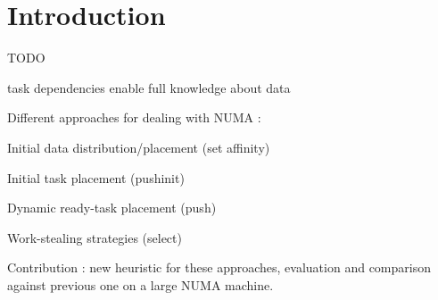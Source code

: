 \documentclass{Styles/llncs}
\begin{document}
\section{Introduction}

TODO

task dependencies enable full knowledge about data

Different approaches for dealing with NUMA :

Initial data distribution/placement (set affinity)

Initial task placement (pushinit)

Dynamic ready-task placement (push)

Work-stealing strategies (select)

Contribution : new heuristic for these approaches, evaluation and comparison against previous one on a large NUMA machine.





\end{document}
